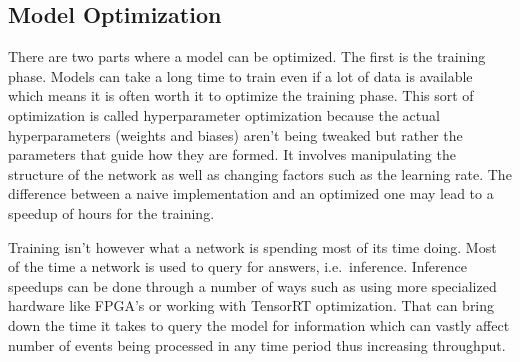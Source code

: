 \subsection{Model Optimization}

There are two parts where a model can be optimized.
The first is the training phase.
Models can take a long time to train even if a lot of data is available which means it is often worth it to optimize the training phase.
This sort of optimization is called hyperparameter optimization because the actual hyperparameters (weights and biases) aren't being tweaked but rather the parameters that guide how they are formed.
It involves manipulating the structure of the network as well as changing factors such as the learning rate.
The difference between a naive implementation and an optimized one may lead to a speedup of hours for the training.

Training isn't however what a network is spending most of its time doing.
Most of the time a network is used to query for answers, i.e.\ inference.
Inference speedups can be done through a number of ways such as using more specialized hardware like FPGA's or working with TensorRT optimization.
That can bring down the time it takes to query the model for information which can vastly affect number of events being processed in any time period thus increasing throughput.







